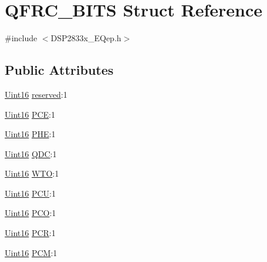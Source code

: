 \hypertarget{struct_q_f_r_c___b_i_t_s}{}\section{Q\+F\+R\+C\+\_\+\+B\+I\+T\+S Struct Reference}
\label{struct_q_f_r_c___b_i_t_s}


{\ttfamily \#include $<$D\+S\+P2833x\+\_\+\+E\+Qep.\+h$>$}

\subsection*{Public Attributes}
\begin{DoxyCompactItemize}
\item 
\hyperlink{_d_s_p2833x___device_8h_a59a9f6be4562c327cbfb4f7e8e18f08b}{Uint16} \hyperlink{struct_q_f_r_c___b_i_t_s_a75c7da7a9ada18bd3f79e230a32d67c5}{reserved}\+:1
\item 
\hyperlink{_d_s_p2833x___device_8h_a59a9f6be4562c327cbfb4f7e8e18f08b}{Uint16} \hyperlink{struct_q_f_r_c___b_i_t_s_ab18b19ae9cc0cc3d5f839bd1199980de}{P\+C\+E}\+:1
\item 
\hyperlink{_d_s_p2833x___device_8h_a59a9f6be4562c327cbfb4f7e8e18f08b}{Uint16} \hyperlink{struct_q_f_r_c___b_i_t_s_ad742b11308e5dca749252b67097b1eae}{P\+H\+E}\+:1
\item 
\hyperlink{_d_s_p2833x___device_8h_a59a9f6be4562c327cbfb4f7e8e18f08b}{Uint16} \hyperlink{struct_q_f_r_c___b_i_t_s_a27552e60bdadacab9af831693d0df1f1}{Q\+D\+C}\+:1
\item 
\hyperlink{_d_s_p2833x___device_8h_a59a9f6be4562c327cbfb4f7e8e18f08b}{Uint16} \hyperlink{struct_q_f_r_c___b_i_t_s_ac1aab146457e3667a4d16850c56103b2}{W\+T\+O}\+:1
\item 
\hyperlink{_d_s_p2833x___device_8h_a59a9f6be4562c327cbfb4f7e8e18f08b}{Uint16} \hyperlink{struct_q_f_r_c___b_i_t_s_a948d7bfe9d807e5e3572d51be18e2307}{P\+C\+U}\+:1
\item 
\hyperlink{_d_s_p2833x___device_8h_a59a9f6be4562c327cbfb4f7e8e18f08b}{Uint16} \hyperlink{struct_q_f_r_c___b_i_t_s_ae5816dfcac21f90a07fc3bfd183d3330}{P\+C\+O}\+:1
\item 
\hyperlink{_d_s_p2833x___device_8h_a59a9f6be4562c327cbfb4f7e8e18f08b}{Uint16} \hyperlink{struct_q_f_r_c___b_i_t_s_aaf7753d52aceb9333b7384b31e6d3ae0}{P\+C\+R}\+:1
\item 
\hyperlink{_d_s_p2833x___device_8h_a59a9f6be4562c327cbfb4f7e8e18f08b}{Uint16} \hyperlink{struct_q_f_r_c___b_i_t_s_a1d0151ae93671fd6f8d4d36de9a19662}{P\+C\+M}\+:1

\end{DoxyCompactItemize}
